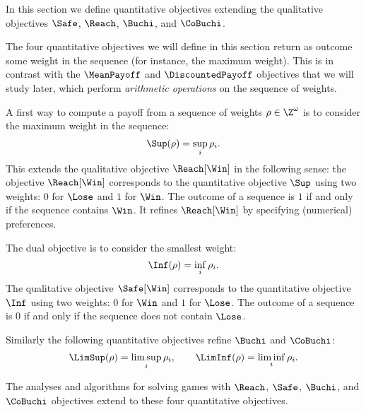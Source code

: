 In this section we define quantitative objectives extending the qualitative objectives $\Safe$, $\Reach$, $\Buchi$, and $\CoBuchi$.

The four quantitative objectives we will define in this section return as outcome some weight in the sequence (for instance, the maximum weight).
This is in contrast with the $\MeanPayoff$ and $\DiscountedPayoff$ objectives that we will study later,
which perform \emph{arithmetic operations} on the sequence of weights.

A first way to compute a payoff from a sequence of weights $\rho \in \Z^\omega$ is to consider the maximum weight in the sequence:
\[
\Sup(\rho) = \sup_i \rho_i.
\]
This extends the qualitative objective $\Reach[\Win]$ in the following sense: 
the objective $\Reach[\Win]$ corresponds to the quantitative objective $\Sup$ using two weights: $0$ for $\Lose$ and $1$ for $\Win$.
The outcome of a sequence is $1$ if and only if the sequence contains $\Win$.
It refines $\Reach[\Win]$ by specifying (numerical) preferences.

The dual objective is to consider the smallest weight:
\[
\Inf(\rho) = \inf_i \rho_i.
\]
The qualitative objective $\Safe[\Win]$ corresponds to the quantitative objective $\Inf$
using two weights: $0$ for $\Win$ and $1$ for $\Lose$.
The outcome of a sequence is $0$ if and only if the sequence does not contain $\Lose$.

Similarly the following quantitative objectives refine $\Buchi$ and $\CoBuchi$:
\[
  \LimSup(\rho) = \limsup_i \rho_i,\qquad 
  \LimInf(\rho) = \liminf_i \rho_i.
\]

The analyses and algorithms for solving games with $\Reach$, $\Safe$, $\Buchi$, and $\CoBuchi$ objectives extend to these four quantitative objectives.


